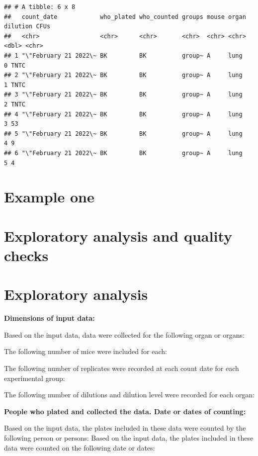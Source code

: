 \documentclass[
]{book}
\begin{document}
\begin{verbatim}
## # A tibble: 6 x 8
##   count_date            who_plated who_counted groups mouse organ dilution CFUs 
##   <chr>                 <chr>      <chr>       <chr>  <chr> <chr>    <dbl> <chr>
## 1 "\"February 21 2022\~ BK         BK          group~ A     lung         0 TNTC 
## 2 "\"February 21 2022\~ BK         BK          group~ A     lung         1 TNTC 
## 3 "\"February 21 2022\~ BK         BK          group~ A     lung         2 TNTC 
## 4 "\"February 21 2022\~ BK         BK          group~ A     lung         3 53   
## 5 "\"February 21 2022\~ BK         BK          group~ A     lung         4 9    
## 6 "\"February 21 2022\~ BK         BK          group~ A     lung         5 4
\end{verbatim}

\hypertarget{example-one}{%
\section{Example one}\label{example-one}}

\hypertarget{exploratory-analysis-and-quality-checks}{%
\section{Exploratory analysis and quality checks}\label{exploratory-analysis-and-quality-checks}}

\hypertarget{exploratory-analysis}{%
\section{Exploratory analysis}\label{exploratory-analysis}}

\textbf{Dimensions of input data:}

Based on the input data, data were collected for the following organ or
organs:

The following number of mice were included for each:

The following number of replicates were recorded at each count date for
each experimental group:

The following number of dilutions and dilution level were recorded for
each organ:

\textbf{People who plated and collected the data. Date or dates of counting:}

Based on the input data, the plates included in these data were counted by
the following person or persons:
Based on the input data, the plates included in these data were counted on
the following date or dates:
\end{document}
